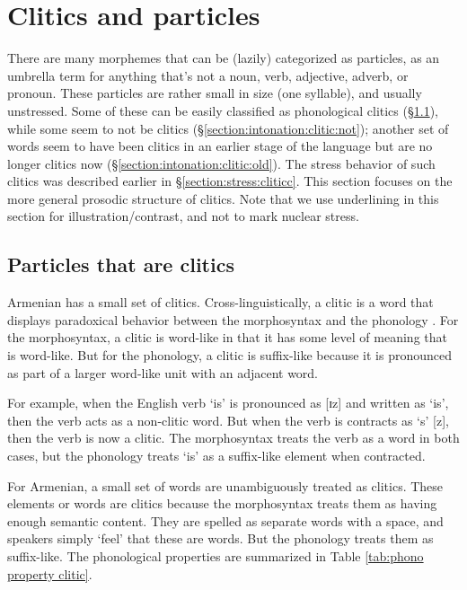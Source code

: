 \section{Clitics and particles}\label{section:intonation:clitic}
There are many   morphemes that can be (lazily) categorized as particles, as an umbrella term for anything that's not a noun, verb, adjective, adverb, or pronoun. These particles   are rather small in size (one syllable), and usually unstressed. Some of these can be easily classified as phonological clitics (\S\ref{section:intonation:clitic:overview}), while some seem to not be clitics (\S\ref{section:intonation:clitic:not}); another set of words seem to have been clitics in an earlier stage of the language but are no longer clitics now (\S\ref{section:intonation:clitic:old}). The stress behavior of such clitics was described earlier in \S\ref{section:stress:cliticc}. This section focuses on the more general prosodic structure of clitics. Note that we use underlining in this section for illustration/contrast, and not to mark nuclear stress. 

\subsection{Particles that are clitics}\label{section:intonation:clitic:overview}



Armenian has a small set of clitics. Cross-linguistically, a clitic is a word that displays paradoxical behavior between the morphosyntax and the phonology \citep{Inkelas-1989-ProsodicLexicon,anderson-2005-aspectsTheoryClitic}. For the morphosyntax, a clitic is word-like in that it has some level of meaning that is word-like. But for the phonology, a clitic is suffix-like because it is pronounced as part of a larger word-like unit with an adjacent word. 

For example, when the English verb `is' is pronounced as [ɪz] and written as `is', then the verb acts as a non-clitic word. But when the verb is contracts as `s' [z], then the verb is now a clitic. The morphosyntax treats the verb as a word in both cases, but the phonology treats `is' as a suffix-like element when contracted. 

For Armenian, a small set of words are unambiguously treated as clitics. These elements or words are clitics because the morphosyntax treats them as having enough semantic content. They are spelled as separate words with a space, and speakers  simply `feel' that these are words. But the phonology treats them as suffix-like. The phonological properties are summarized in Table \ref{tab:phono property clitic}. 

